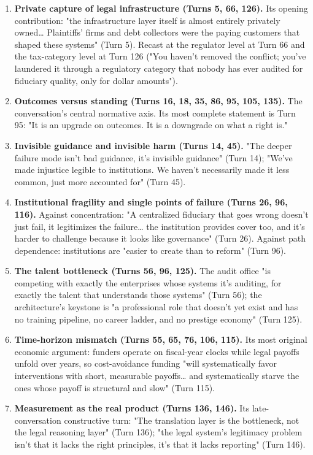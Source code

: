 \documentclass[sigconf,nonacm=true]{acmart}
\begin{document}
\begin{enumerate}[nosep]
\item \textbf{Private capture of legal infrastructure (Turns 5, 66, 126).} Its opening contribution: "the infrastructure layer itself is almost entirely privately owned… Plaintiffs' firms and debt collectors were the paying customers that shaped these systems" (Turn 5). Recast at the regulator level at Turn 66 and the tax-category level at Turn 126 ("You haven't removed the conflict; you've laundered it through a regulatory category that nobody has ever audited for fiduciary quality, only for dollar amounts").
\item \textbf{Outcomes versus standing (Turns 16, 18, 35, 86, 95, 105, 135).} The conversation's central normative axis. Its most complete statement is Turn 95: "It is an upgrade on outcomes. It is a downgrade on what a right is."
\item \textbf{Invisible guidance and invisible harm (Turns 14, 45).} "The deeper failure mode isn't bad guidance,  it's invisible guidance" (Turn 14); "We've made injustice legible to institutions. We haven't necessarily made it less common,  just more accounted for" (Turn 45).
\item \textbf{Institutional fragility and single points of failure (Turns 26, 96, 116).} Against concentration: "A centralized fiduciary that goes wrong doesn't just fail,  it legitimizes the failure… the institution provides cover too, and it's harder to challenge because it looks like governance" (Turn 26). Against path dependence: institutions are "easier to create than to reform" (Turn 96).
\item \textbf{The talent bottleneck (Turns 56, 96, 125).} The audit office "is competing with exactly the enterprises whose systems it's auditing, for exactly the talent that understands those systems" (Turn 56); the architecture's keystone is "a professional role that doesn't yet exist and has no training pipeline, no career ladder, and no prestige economy" (Turn 125).
\item \textbf{Time-horizon mismatch (Turns 55, 65, 76, 106, 115).} Its most original economic argument: funders operate on fiscal-year clocks while legal payoffs unfold over years, so cost-avoidance funding "will systematically favor interventions with short, measurable payoffs… and systematically starve the ones whose payoff is structural and slow" (Turn 115).
\item \textbf{Measurement as the real product (Turns 136, 146).} Its late-conversation constructive turn: "The translation layer is the bottleneck, not the legal reasoning layer" (Turn 136); "the legal system's legitimacy problem isn't that it lacks the right principles, it's that it lacks reporting" (Turn 146).

\end{enumerate}
\end{document}
